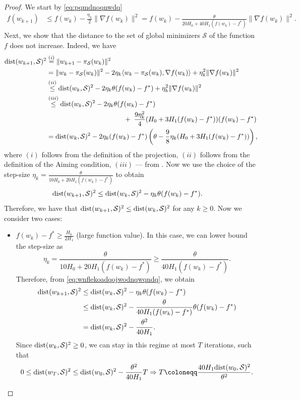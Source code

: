 \documentclass[a4paper,11pt]{article}
\newcommand{\cS}{\mathcal{S}}
\newcommand{\1}{\mathbbm{1}}
\newcommand{\eqdef}{\coloneqq}
\theoremstyle{plain}
\begin{document}
\theoremaimingdeterministic*
\begin{proof}
    We start by \eqref{eq:pqmdnoqnwdq}
    \begin{align}\label{eq:ejfonqejfq}
        f(w_{k+1}) &\le f(w_k) - \frac{\eta_k}{2}\|\nabla f(w_k)\|^2 = f(w_k) - \frac{\theta}{20H_0+40H_1(f(w_k)-f^*)}\|\nabla f(w_k)\|^2.
    \end{align}
    Next, we show that the distance to the set of global minimizers $\cS$ of the function $f$ does not increase. Indeed, we have 
        \begin{align*}
            {\rm dist}(w_{k+1},\cS)^2 &\overset{(i)}{=} \|w_{k+1}-\pi_{\cS}(w_k)\|^2 \\ 
            &= \|w_k-\pi_{\cS}(w_k)\|^2 -2\eta_k\langle w_k-\pi_{\cS}(w_k), \nabla f(w_k)\rangle + \eta_k^2\|\nabla f(w_k)\|^2\\
            &\overset{(ii)}{\le} {\rm dist}(w_k,\cS)^2 -2\eta_k\theta(f(w_k)-f^*) + \eta_k^2\|\nabla f(w_k)\|^2\\
            &\overset{(iii)}{\le} {\rm dist}(w_k,\cS)^2 -2\eta_k\theta(f(w_k)-f^*)\\
            &\hspace{4cm}+\; \frac{9\eta_k^2}{4}(H_0 + 3H_1(f(w_k)-f^*))(f(w_k)-f^*)\\
            &= {\rm dist}(w_k,\cS)^2 - 2\eta_k(f(w_k)-f^*)\left(\theta - \frac{9}{8}\eta_k(H_0 + 3H_1(f(w_k)-f^*))\right),
        \end{align*}
        where $(i)$ follows from the definition of the projection, $(ii)$ follows from the definition of the Aiming condition, $(iii)$ --- from . Now we use the choice of the step-size $\eta_k = \frac{\theta}{10 H_0+20 H_1(f(w_k)-f^*)}$ to obtain
        \begin{align}\label{eq:wnflekoadqojwodnqwqndq}
            {\rm dist}(w_{k+1},\cS)^2 &\le {\rm dist}(w_k,\cS)^2 - \eta_k\theta(f(w_k)-f^*).
        \end{align}
        Therefore, we have that ${\rm dist}(w_{k+1},\cS)^2 \le {\rm dist}(w_k,\cS)^2$ for any $k\ge 0.$ Now we consider two cases:
    \begin{itemize}
        \item $f(w_k) - f^* \ge \frac{H_0}{2H_1}$ (large function value).  In this case, we can lower bound the step-size as 
        \[
        \eta_k = \frac{\theta}{10H_0 + 20H_1(f(w_k)-f^*)} \ge \frac{\theta}{40H_1(f(w_k)-f^*)}.
        \]
        Therefore, from \eqref{eq:wnflekoadqojwodnqwqndq}, we obtain
        \begin{align*}
             {\rm dist}(w_{k+1},\cS)^2 &\le {\rm dist}(w_k,\cS)^2 - \eta_k\theta(f(w_k)-f^*) \\
             &\le {\rm dist}(w_k,\cS)^2 - \frac{\theta}{40H_1(f(w_k)-f^*)}\theta(f(w_k)-f^*)\\
             &= {\rm dist}(w_k,\cS)^2 - \frac{\theta^2}{40H_1}.
        \end{align*}
        Since ${\rm dist}(w_k,\cS)^2  \ge 0$, we can stay in this regime at most $T$ iterations, such that
        \[
        0 \leq {\rm dist}(w_T,\cS)^2 \le {\rm dist}(w_0,\cS)^2 - \frac{\theta^2}{40H_1} T  \Rightarrow T \eqdef \frac{40H_1{\rm dist}(w_0,\cS)^2 }{\theta^2}.
        \]


\end{itemize}
\end{proof}
\end{document}
